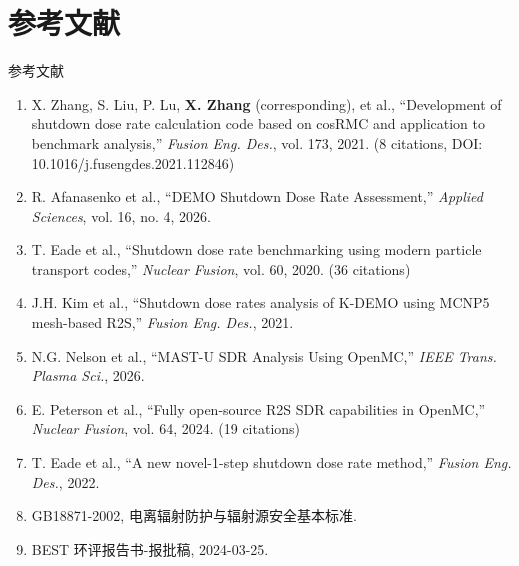 \documentclass[aspectratio=169]{ctexbeamer}
\begin{document}
\section{参考文献}

\begin{frame}[allowframebreaks]{参考文献}
	\small
	\begin{enumerate}
		\item X. Zhang, S. Liu, P. Lu, \textbf{X. Zhang} (corresponding), et al., ``Development of shutdown dose rate calculation code based on cosRMC and application to benchmark analysis,'' \textit{Fusion Eng. Des.}, vol. 173, 2021. (8 citations, DOI: 10.1016/j.fusengdes.2021.112846)
		\item R. Afanasenko et al., ``DEMO Shutdown Dose Rate Assessment,'' \textit{Applied Sciences}, vol. 16, no. 4, 2026.
		\item T. Eade et al., ``Shutdown dose rate benchmarking using modern particle transport codes,'' \textit{Nuclear Fusion}, vol. 60, 2020. (36 citations)
		\item J.H. Kim et al., ``Shutdown dose rates analysis of K-DEMO using MCNP5 mesh-based R2S,'' \textit{Fusion Eng. Des.}, 2021.
		\item N.G. Nelson et al., ``MAST-U SDR Analysis Using OpenMC,'' \textit{IEEE Trans. Plasma Sci.}, 2026.
		\item E. Peterson et al., ``Fully open-source R2S SDR capabilities in OpenMC,'' \textit{Nuclear Fusion}, vol. 64, 2024. (19 citations)
		\item T. Eade et al., ``A new novel-1-step shutdown dose rate method,'' \textit{Fusion Eng. Des.}, 2022.
		\item GB18871-2002, 电离辐射防护与辐射源安全基本标准.
		\item BEST 环评报告书-报批稿, 2024-03-25.
	\end{enumerate}
\end{frame}

\end{document}
